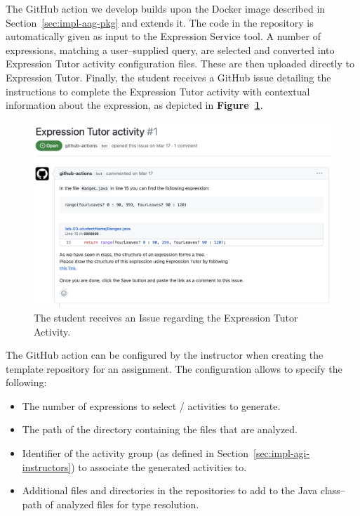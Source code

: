 \begin{chapterBody}
The GitHub action we develop builds upon the Docker image described in
Section~\ref{sec:impl-aag-pkg} and extends it. The code in the repository is
automatically given as input to the Expression Service tool.
A number of expressions, matching a user–supplied query, are selected and
converted into Expression Tutor activity configuration files. These are then
uploaded directly to Expression Tutor. Finally, the student receives a GitHub
issue detailing the instructions to complete the Expression Tutor activity with
contextual information about the expression, as depicted in
\textbf{Figure~\ref{fig:impl-gi-issue}}.

\begin{figure}[ht]
    \centering
    \includegraphics[width=\linewidth]{res/6/gh_activity_issue.png}
    \caption{The student receives an Issue regarding the Expression Tutor 
Activity.}
    \label{fig:impl-gi-issue}
\end{figure}

The GitHub action can be configured by the instructor when creating the
template repository for an assignment. The configuration allows to specify the
following:

\begin{itemize}
    \item The number of expressions to select / activities to generate.
    \item The path of the directory containing the files that are analyzed.
    \item Identifier of the activity group (as defined in
Section~\ref{sec:impl-agi-instructors}) to associate the generated activities to.
    \item Additional files and directories in the repositories to add to
the Java class–path of analyzed files for type resolution.
\end{itemize}


\end{chapterBody}
